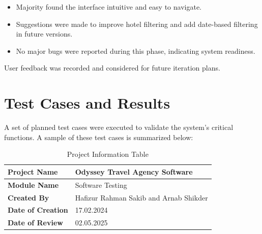 \begin{itemize}
    \item Majority found the interface intuitive and easy to navigate.
    \item Suggestions were made to improve hotel filtering and add date-based filtering in future versions.
    \item No major bugs were reported during this phase, indicating system readiness.
\end{itemize}

User feedback was recorded and considered for future iteration plans.

\section{Test Cases and Results}
A set of planned test cases were executed to validate the system’s critical functions. A sample of these test cases is summarized below:


\begin{longtable}{|L{6cm}|L{10cm}|}
    \caption{Project Information Table} \label{tab:project_info} \\
    \hline
    \textbf{Project Name} & Odyssey Travel Agency Software
    \\ \hline
    \textbf{Module Name} & Software Testing \\ \hline
    \textbf{Created By} & Hafizur Rahman Sakib and Arnab Shikder \\ \hline
    \textbf{Date of Creation} & 17.02.2024 \\ \hline
    \textbf{Date of Review} & 02.05.2025 \\ \hline
  \end{longtable}


